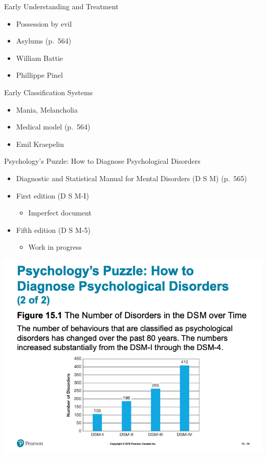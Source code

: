 \documentclass[
]{book}
\providecommand{\tightlist}{%
  \setlength{\itemsep}{0pt}\setlength{\parskip}{0pt}}
\begin{document}
\begin{reflect}
Early Understanding and Treatment

\begin{itemize}
\tightlist
\item
  Possession by evil\\
\item
  Asylums (p.~564)\\
\item
  William Battie\\
\item
  Phillippe Pinel
\end{itemize}

Early Classification Systems

\begin{itemize}
\tightlist
\item
  Mania, Melancholia\\
\item
  Medical model (p.~564)\\
\item
  Emil Kraepelin
\end{itemize}

Psychology's Puzzle: How to Diagnose Psychological Disorders

\begin{itemize}
\tightlist
\item
  Diagnostic and Statistical Manual for Mental Disorders (D S M) (p.~565)\\
\item
  First edition (D S M-I)

  \begin{itemize}
  \tightlist
  \item
    Imperfect document\\
  \end{itemize}
\item
  Fifth edition (D S M-5)

  \begin{itemize}
  \tightlist
  \item
    Work in progress
  \end{itemize}
\end{itemize}

\includegraphics{assets/unit_10/slide_14.png}


\end{reflect}
\end{document}
